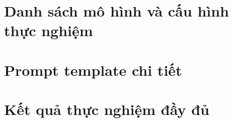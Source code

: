 ﻿\documentclass[12pt]{report}
\begin{document}
\renewcommand{\bibname}{Danh sách tham khảo}



\appendix

\chapter{Danh sách mô hình và cấu hình thực nghiệm}\label{app:models}

\chapter{Prompt template chi tiết}\label{app:prompts}

\chapter{Kết quả thực nghiệm đầy đủ}\label{app:results}
\end{document}
